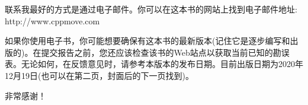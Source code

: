 联系我最好的方式是通过电子邮件。你可以在这本书的网站上找到电子邮件地址:\\http://www.cppmove.com

如果你使用电子书，你可能想要确保有这本书的最新版本(记住它是逐步编写和出版的)。在提交报告之前，您还应该检查该书的Web站点以获取当前已知的勘误表。无论如何，在反馈意见时，请参考本版本的发布日期。目前出版日期为2020年12月19日(也可以在第二页，封面后的下一页找到)。

非常感谢！






















